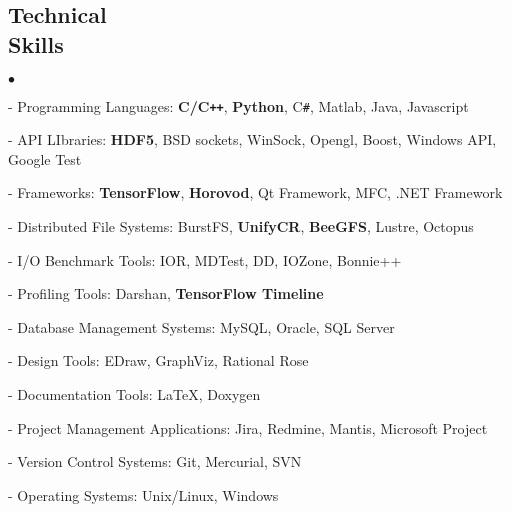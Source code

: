 \documentclass[margin,line]{res}
\newenvironment{list2}{
  \begin{list}{$\bullet$}{%
      \setlength{\itemsep}{0in}
      \setlength{\parsep}{0in} \setlength{\parskip}{0in}
      \setlength{\topsep}{0in} \setlength{\partopsep}{0in} 
      \setlength{\leftmargin}{0.2in}}}{\end{list}}
\begin{document}
\begin{resume}
\section{\sc Technical \\Skills}
\begin{list2}
\item[ - ] Programming Languages: {\bf C/C\texttt{++}}, {\bf Python}, C\texttt{\#}, Matlab, Java, Javascript
\item[ - ] API LIbraries: {\bf HDF5}, BSD sockets, WinSock, Opengl, Boost, Windows API, Google Test
\item[ - ] Frameworks: {\bf TensorFlow}, {\bf Horovod}, Qt Framework, MFC, .NET Framework
\item[ - ] Distributed File Systems: BurstFS, {\bf UnifyCR}, {\bf BeeGFS}, Lustre, Octopus
\item[ - ] I/O Benchmark Tools: IOR, MDTest, DD, IOZone, Bonnie++
\item[ - ] Profiling Tools: Darshan, {\bf TensorFlow Timeline}
\item[ - ] Database Management Systems: MySQL, Oracle, SQL Server
\item[ - ] Design Tools: EDraw, GraphViz, Rational Rose
\item[ - ] Documentation Tools: \LaTeX, Doxygen
\item[ - ] Project Management Applications: Jira, Redmine, Mantis, Microsoft Project
\item[ - ] Version Control Systems: Git, Mercurial, SVN
\item[ - ] Operating Systems: Unix/Linux, Windows
\end{list2}

\vspace*{-.1in}


\end{resume}
\end{document}
